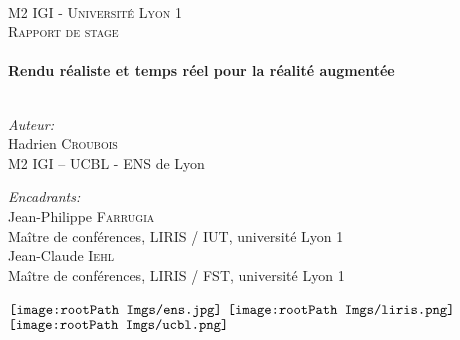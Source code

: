 \documentclass[10pt,a4paper,twoside, twocolumn]{report}
\newcommand*{\rootPath}{../}
\begin{document}
\begin{titlepage}
\begin{center}
		
	~\\[3.0cm]
	
	\textsc{\LARGE M2 IGI - Université Lyon 1}\\[1.5cm]
	\textsc{\Large Rapport de stage}\\[1.5cm]
	
	\HRule \\[0.4cm]
	{ \huge \bfseries Rendu réaliste et temps réel pour la réalité augmentée \\[0.4cm] }
	\HRule \\[1.5cm]

	\begin{minipage}[t]{0.4\textwidth}
	\begin{flushleft}
			\large \emph{Auteur:}\\[0.2cm]
			\large Hadrien \textsc{Croubois}\\
			\small M2 IGI -- UCBL - ENS de Lyon
	\end{flushleft}
	\end{minipage}
	\begin{minipage}[t]{0.5\textwidth}
	\begin{flushright}
			\large \emph{Encadrants:} \\[0.2cm]
			\large Jean-Philippe \textsc{Farrugia}\\
			\small Maître de conférences, LIRIS / IUT, université Lyon 1\\[0.2cm]
			\large Jean-Claude \textsc{Iehl}\\
			\small Maître de conférences, LIRIS / FST, université Lyon 1\\[0.2cm]
			\small
	\end{flushright}
	\end{minipage}

	\vfill
	
	\begin{minipage}{\textwidth}
	\begin{center}
		$\vcenter{\hbox{\texttt{[image: \\rootPath Imgs/ens.jpg]}}}$
		\hspace*{2cm}
		$\vcenter{\hbox{\texttt{[image: \\rootPath Imgs/liris.png]}}}$
		\hspace*{2cm}
		$\vcenter{\hbox{\texttt{[image: \\rootPath Imgs/ucbl.png]}}}$
	\end{center}
	\end{minipage}
\end{center}
\end{titlepage}
\end{document}
